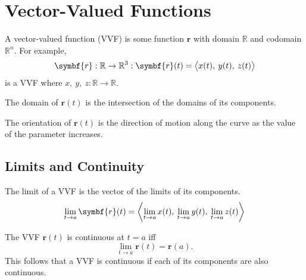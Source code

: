 \documentclass{article}
\begin{document}
\section{Vector-Valued Functions}
\begin{definition}
    A vector-valued function (VVF) is some function $\symbf{r}$
    with domain $\mathbb{R}$ and codomain $\mathbb{R}^n$.
    For example,
    \begin{equation*}
        \symbf{r}:\mathbb{R}\to\mathbb{R}^3
        :\symbf{r}(t)=\avec[\big]{x(t),\: y(t),\: z(t)}
    \end{equation*}
    is a VVF where $x,\:y,\:z: \mathbb{R}\to\mathbb{R}$.
\end{definition}
\begin{theorem}
    The domain of $\symbf{r}(t)$ is the intersection of the domains
    of its components.
\end{theorem}
\begin{definition}[Orientation]
    The orientation of $\symbf{r}(t)$ is the direction of motion along the
    curve as the value of the parameter increases.
\end{definition}
\subsection{Limits and Continuity}
\begin{theorem}
    The limit of a VVF is the vector of the limits of its components.
    \begin{equation*}
        \lim_{t\to a} \symbf{r}(t)
        = \avec[\bigg]{\lim_{t\to a} x(t),\: \lim_{t\to a} y(t),\: \lim_{t\to a} z(t)}
    \end{equation*}
\end{theorem}
\begin{theorem}
    The VVF $\symbf{r}(t)$ is continuous at $t=a$ iff
    \begin{equation*}
        \lim_{t\to a} \symbf{r}(t) = \symbf{r}(a).
    \end{equation*}
    This follows that a VVF is continuous if each of its components are also continuous.
\end{theorem}
\end{document}
